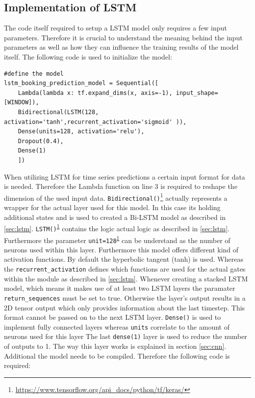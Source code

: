 \subsection{Implementation of LSTM}
The code itself required to setup a LSTM model only requires a few input parameters. Therefore it is crucial to understand the meaning behind the input parameters as well as how they can influence the training results of the model itself. The following code is used to initialize the model:   
\begin{lstlisting}
#define the model
lstm_booking_prediction_model = Sequential([
    Lambda(lambda x: tf.expand_dims(x, axis=-1), input_shape=[WINDOW]),
    Bidirectional(LSTM(128, activation='tanh',recurrent_activation='sigmoid' )),
    Dense(units=128, activation='relu'),
    Dropout(0.4),
    Dense(1)
	])
\end{lstlisting}
When utilizing LSTM for time series predictions a certain input format for data is needed. Therefore the Lambda function on line 3 is required to reshape the dimension of the used input data. 
\verb|Bidirectional()|\footnote{\label{tf_fn}\url{https://www.tensorflow.org/api_docs/python/tf/keras/}} actually represents a wrapper for the actual layer used for this model. In this case its holding additional states and is used to created a Bi-LSTM model as described in \ref{sec:lstm}. \newline
\verb|LSTM()|\textsuperscript{\ref{tf_fn}} contains the logic actual logic as described in \ref{sec:lstm}. Furthermore the parameter \verb|unit=128|\textsuperscript{\ref{tf_fn}} can be understand as the number of neurons used within this layer. Furthermore this model offers different kind of activation functions. By default the hyperbolic tangent (tanh)\cite{tanh} is used. Whereas the \verb|recurrent_activation| defines which functions are used for the actual gates within the module as described in \ref{sec:lstm}. Whenever creating a stacked LSTM model, which means it makes use of at least two LSTM layers the paramater \verb|return_sequences| must be set to true. Otherwise the layer's output results in a 2D tensor output which only provides information about the last timestep. This format cannot be passed on to the next LSTM layer. \newline
\verb|Dense()| is used to implement fully connected layers whereas \verb|units| correlate to the amount of neurons used for this layer The last \verb|dense(1)| layer is used to reduce the number of outputs to 1. The way this layer works is explained in section \ref{sec:cnn}. Additional the model needs to be compiled. Therefore the following code is required: 
